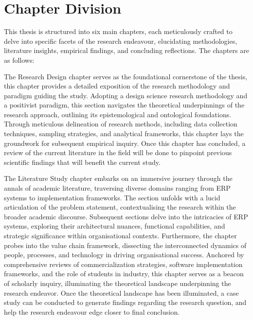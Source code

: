 \section{Chapter Division}
\par{This thesis is structured into six main chapters, each meticulously crafted to delve into specific
facets of the research endeavour, elucidating methodologies, literature insights, empirical findings, and concluding reflections. The chapters are as follows:}
\par{The Research Design chapter serves as the foundational cornerstone of the thesis, this chapter
provides a detailed exposition of the research methodology and paradigm guiding the study. Adopting a design science research methodology and a positivist paradigm, this section navigates the theoretical underpinnings of the research approach, outlining its epistemological and ontological foundations. Through meticulous delineation of research
methods, including data collection techniques, sampling strategies, and analytical frameworks, this chapter lays the groundwork for subsequent empirical inquiry. Once this chapter has concluded, a review of the current literature in the field will be done to pinpoint previous scientific findings that will benefit the current study.}
\par{The Literature Study chapter embarks on an immersive journey through the annals of academic literature, traversing diverse domains ranging from ERP systems to implementation frameworks. The section unfolds with a lucid articulation of the problem statement, contextualising the research within the broader academic discourse. Subsequent sections delve into the intricacies of ERP systems, exploring their architectural nuances, functional capabilities, and strategic significance within organisational contexts. Furthermore, the chapter probes into the value chain framework, dissecting the interconnected dynamics of people, processes, and technology in driving organisational success. Anchored by comprehensive reviews of commercialization strategies, software implementation frameworks, and the role of students in industry, this chapter serves as a beacon of scholarly inquiry, illuminating the theoretical landscape underpinning the research endeavor. Once the theoretical landscape has been illuminated, a case study can be conducted to generate findings regarding the research question, and help the research endeavour edge closer to final conclusion.}
